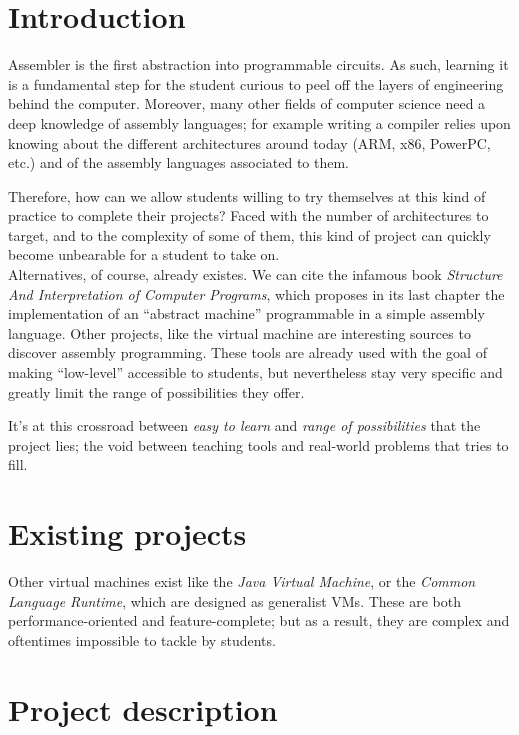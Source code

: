 \documentclass[11pt,twoside]{article}
\begin{document}
  \section{Introduction}

  Assembler is the first abstraction into programmable circuits. As such, learning it is a fundamental step for the student curious to peel off the layers of engineering behind the computer. Moreover, many other fields of computer science need a deep knowledge of assembly languages; for example writing a compiler relies upon knowing about the different architectures around today (ARM, x86, PowerPC, etc.) and of the assembly languages associated to them.

  Therefore, how can we allow students willing to try themselves at this kind of practice to complete their projects? Faced with the number of architectures to target, and to the complexity of some of them, this kind of project can quickly become unbearable for a student to take on.\\
  Alternatives, of course, already existes. We can cite the infamous book \emph{Structure And Interpretation of Computer Programs}\cite{SICP}, which proposes in its last chapter the implementation of an ``abstract machine'' programmable in a simple assembly language. Other projects, like the virtual machine  are interesting sources to discover assembly programming\cite{CHIP8}. These tools are already used with the goal of making ``low-level'' accessible to students, but nevertheless stay very specific and greatly limit the range of possibilities they offer.

  It's at this crossroad between \emph{easy to learn} and \emph{range of possibilities} that the project lies; the void between teaching tools and real-world problems that  tries to fill.

  \section{Existing projects}

  Other virtual machines exist like the \emph{Java Virtual Machine}, or the \emph{Common Language Runtime}, which are designed as generalist VMs. These are both performance-oriented and feature-complete; but as a result, they are complex and oftentimes impossible to tackle by students.

  \vfill
  \newpage

  \section{Project description}
\end{document}
